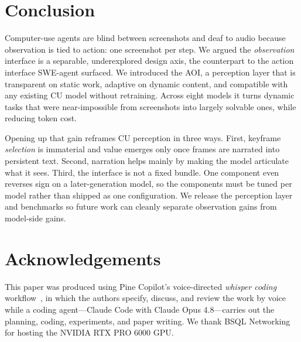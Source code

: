 \documentclass[11pt]{article}
\begin{document}
\section{Conclusion}
\label{sec:conclusion}

Computer-use agents are blind between screenshots and deaf to audio because
observation is tied to action: one screenshot per step.
We argued the \emph{observation} interface is a separable, underexplored design
axis, the counterpart to the action interface SWE-agent surfaced. We introduced
the AOI, a perception layer that is transparent on static work, adaptive on
dynamic content, and compatible with any existing CU model without retraining.
Across eight models it turns dynamic tasks that were near-impossible from
screenshots into largely solvable ones, while reducing token cost.

Opening up that gain reframes CU perception in three ways. First, keyframe \emph{selection}
is immaterial and value emerges only once frames are narrated into persistent text.
Second, narration helps mainly by making the model articulate what it sees. Third, the
interface is not a fixed bundle. One component even reverses sign on a
later-generation model, so the components must be tuned per model rather than
shipped as one configuration.
We release the perception layer and benchmarks so future work can cleanly separate
observation gains from model-side gains.

\section*{Acknowledgements}

This paper was produced using Pine Copilot's voice-directed \emph{whisper coding} workflow~\citep{pineai2026whispercoding}, in which the authors specify, discuss, and review the work by voice while a coding agent---Claude Code with Claude Opus 4.8---carries out the planning, coding, experiments, and paper writing.
We thank BSQL Networking for hosting the NVIDIA RTX PRO 6000 GPU.



\end{document}
